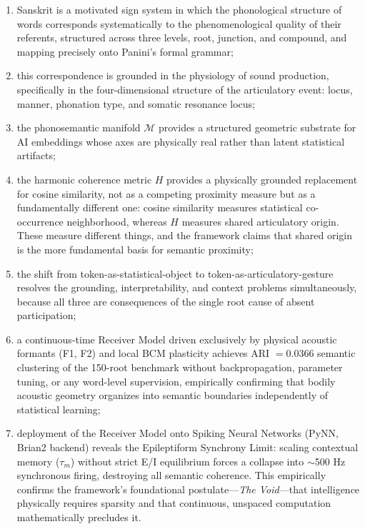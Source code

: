 \documentclass[12pt]{article}
\begin{document}
\begin{enumerate}
  \item Sanskrit is a motivated sign system in which the phonological structure of words corresponds systematically to the phenomenological quality of their referents, structured across three levels, root, junction, and compound, and mapping precisely onto Panini's formal grammar;
  \item this correspondence is grounded in the physiology of sound production, specifically in the four-dimensional structure of the articulatory event: locus, manner, phonation type, and somatic resonance locus;
  \item the phonosemantic manifold $\mathcal{M}$ provides a structured geometric substrate for AI embeddings whose axes are physically real rather than latent statistical artifacts;
  \item the harmonic coherence metric $H$ provides a physically grounded replacement for cosine similarity, not as a competing proximity measure but as a fundamentally different one: cosine similarity measures statistical co-occurrence neighborhood, whereas $H$ measures shared articulatory origin. These measure different things, and the framework claims that shared origin is the more fundamental basis for semantic proximity;
  \item the shift from token-as-statistical-object to token-as-articulatory-gesture resolves the grounding, interpretability, and context problems simultaneously, because all three are consequences of the single root cause of absent participation;
  \item a continuous-time Receiver Model driven exclusively by physical acoustic formants (F1, F2) and local BCM plasticity achieves ARI $= 0.0366$ semantic clustering of the 150-root benchmark without backpropagation, parameter tuning, or any word-level supervision, empirically confirming that bodily acoustic geometry organizes into semantic boundaries independently of statistical learning;
  \item deployment of the Receiver Model onto Spiking Neural Networks (PyNN, Brian2 backend) reveals the Epileptiform Synchrony Limit: scaling contextual memory ($\tau_m$) without strict E/I equilibrium forces a collapse into $\sim$500 Hz synchronous firing, destroying all semantic coherence. This empirically confirms the framework's foundational postulate---\textit{The Void}---that intelligence physically requires sparsity and that continuous, unspaced computation mathematically precludes it.
\end{enumerate}
\end{document}
